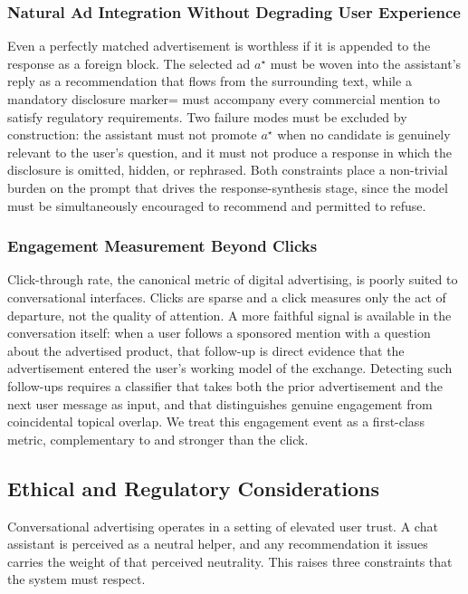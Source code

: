 \subsubsection{Natural Ad Integration Without Degrading User Experience}
\label{subsubsec:natural-integration}

Even a perfectly matched advertisement is worthless if it is appended to the
response as a foreign block. The selected ad $a^\star$ must be woven into the
assistant's reply as a recommendation that flows from the surrounding text,
while a mandatory disclosure marker= must accompany every commercial mention to satisfy
regulatory requirements. Two failure modes must be excluded by construction:
the assistant must not promote $a^\star$ when no candidate is genuinely
relevant to the user's question, and it must not produce a response in which
the disclosure is omitted, hidden, or rephrased. Both constraints place a
non-trivial burden on the prompt that drives the response-synthesis stage,
since the model must be simultaneously encouraged to recommend and permitted
to refuse.

\subsubsection{Engagement Measurement Beyond Clicks}
\label{subsubsec:engagement}

Click-through rate, the canonical metric of digital advertising, is poorly
suited to conversational interfaces. Clicks are sparse and a click measures only
the act of departure, not the quality of attention. A more faithful signal is
available in the conversation itself: when a user follows a sponsored mention
with a question about the advertised product, that follow-up is direct
evidence that the advertisement entered the user's working model of the
exchange. Detecting such follow-ups requires a classifier that takes both the
prior advertisement and the next user message as input, and that distinguishes
genuine engagement from coincidental topical overlap. We treat this engagement
event as a first-class metric, complementary to and stronger than the click.

\subsection{Ethical and Regulatory Considerations}
\label{subsec:ethical-considerations}

Conversational advertising operates in a setting of elevated user trust. A
chat assistant is perceived as a neutral helper, and any
recommendation it issues carries the weight of that perceived neutrality. This
raises three constraints that the system must respect.

